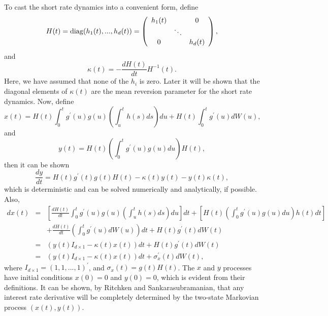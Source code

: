 \documentclass[12pt]{article}
\begin{document}
  To cast the short rate dynamics into a convenient form, define
  \begin{equation}
    H(t)={\rm diag}(h_1(t),...,h_d(t))=\left(
      \begin{array}{ccc}
        h_1(t) & & 0 \\
          & \ddots & \\
          0 & & h_d(t)
      \end{array}
    \right),
  \end{equation}
  and
  \begin{equation}
    \kappa(t) = -\frac{dH(t)}{dt}H^{-1}(t).
  \end{equation}
  Here, we have assumed that none of the $h_i$ is zero. Later it will be shown that the diagonal elements of $\kappa(t)$
  are the mean reversion parameter for the short rate dynamics. Now, define
  \begin{equation}
    x(t)=H(t)\int_0^tg^{\prime}(u)g(u)\left(\int_u^th(s)ds\right)du+H(t)\int_0^tg^{\prime}(u)dW(u),
  \end{equation}
  and
  \begin{equation}
    y(t)=H(t)\left(\int_0^tg^{\prime}(u)g(u)du\right)H(t),
  \end{equation}
  then it can be shown
  \begin{equation}
    \frac{dy}{dt} = H(t)g^{\prime}(t)g(t)H(t) - \kappa(t)y(t) - y(t)\kappa(t),
  \end{equation}
  which is deterministic and can be solved numerically and analytically, if possible. Also,
  \begin{eqnarray}
    dx(t) &=& \left[\frac{dH(t)}{dt}\int_0^tg^{\prime}(u)g(u)\left(\int_u^th(s)ds\right)du\right]dt
            + \left[H(t)\left(\int_0^tg^{\prime}(u)g(u)du\right)h(t)dt\right]\nonumber\\
          &&+ \frac{dH(t)}{dt}\left(\int_0^tg^{\prime}(u)dW(u)\right)dt
            + H(t)g^{\prime}(t)dW(t)\nonumber\\
          &=& (y(t)I_{d\times 1}-\kappa(t)x(t))dt+H(t)g^{\prime}(t)dW(t)\nonumber\\
          &=& (y(t)I_{d\times 1}-\kappa(t)x(t))dt+\sigma_x^{\prime}(t)dW(t),
  \end{eqnarray}
  where $I_{d\times 1}=(1,1,...,1)^{\prime}$, and $\sigma_x(t)=g(t)H(t)$. The $x$ and $y$ processes have
  initial conditions $x(0)=0$ and $y(0)=0$, which is evident from their definitions. It can be shown,
  by Ritchken and Sankarasubramanian, that any interest rate derivative will be completely determined
  by the two-state Markovian process $(x(t), y(t))$.
  
\end{document}
